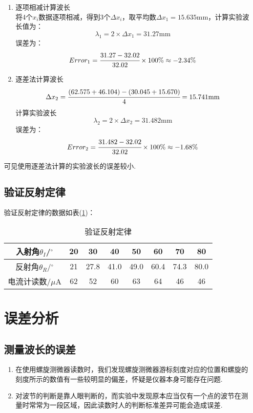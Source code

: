 \documentclass[a4paper]{article}
\begin{document}
\begin{enumerate}
\item 逐项相减计算波长\\
将4个$x_i$数据逐项相减，得到3个$\Delta x_i$，取平均数$\Delta x_1 = 15.635$mm，计算实验波长值为：
\begin{equation}
\lambda_1 = 2\times\Delta x_1 = 31.27\text{mm}
\end{equation}
误差为：
\begin{equation}
Error_1 = \cfrac{31.27 - 32.02}{32.02}\times 100\% \approx -2.34\%
\end{equation}
\item 逐差法计算波长\\
\begin{equation}
\Delta x_2 = \cfrac{(62.575+46.104) - (30.045+15.670)}{4} = 15.741\text{mm}
\end{equation}
计算实验波长
\begin{equation}
\lambda_2 = 2\times\Delta x_2 = 31.482\text{mm}
\end{equation}
误差为：
\begin{equation}
Error_2 = \cfrac{31.482 - 32.02}{32.02}\times 100\% \approx -1.68\%
\end{equation}
\end{enumerate}
可见使用逐差法计算的实验波长的误差较小.
\subsection{验证反射定律}
验证反射定律的数据如表(\ref{ReflexLaw})：
\begin{table}[!h]
\centering
\caption{验证反射定律}
\label{ReflexLaw}
\begin{tabular}{|c|c|c|c|c|c|c|c|}
\hline
入射角$\theta_I$/$^\circ$ & 20 & 30   & 40   & 50   & 60   & 70   & 80   \\ \hline
反射角$\theta_R$/$^\circ$ & 21 & 27.8 & 41.0 & 49.0 & 60.4 & 74.3 & 80.0 \\ \hline
电流计读数/$\mu$A           & 62 & 52   & 60   & 63   & 64   & 46   & 46   \\ \hline
\end{tabular}
\end{table}

\section{误差分析}
\subsection{测量波长的误差}
\begin{enumerate}
\item 在使用螺旋测微器读数时，我们发现螺旋测微器游标刻度对应的位置和螺旋的刻度所示的数值有一些较明显的偏差，怀疑是仪器本身可能存在问题.
\item 对波节的判断是靠人眼判断的，而实验中发现原本应当仅有一个点的波节在测量时常常为一段区域，因此读数时人的判断标准差异可能会造成误差.
\end{enumerate}
\end{document}
